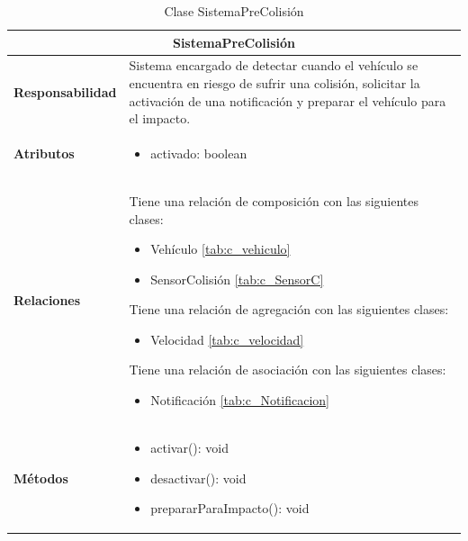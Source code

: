 \begin{table}[H]
\begin{center}
\begin{tabular}{p{} p{11cm}}
\multicolumn{2}{c}{\textbf{SistemaPreColisión} } \\ \hline \hline
\textbf{Responsabilidad} &  Sistema encargado de detectar cuando el vehículo se encuentra en riesgo de sufrir una colisión, solicitar la activación de una notificación y preparar el vehículo para el impacto.  \\ \hline
\textbf{Atributos} & \begin{itemize}
                      \item activado: boolean
                    \end{itemize}\\ \hline
\textbf{Relaciones} & \par Tiene una relación de composición con las siguientes clases:
                      \begin{itemize}
                        \item Vehículo \ref{tab:c_vehiculo}
                        \item SensorColisión \ref{tab:c_SensorC}
                      \end{itemize}

                      \par Tiene una relación de agregación con las siguientes clases:
                      \begin{itemize}
                        \item Velocidad \ref{tab:c_velocidad}
                      \end{itemize}

                      \par Tiene una relación de asociación con las siguientes clases:
                      \begin{itemize}
                        \item Notificación \ref{tab:c_Notificacion}
                      \end{itemize}


                      \\ \hline

\textbf{Métodos} &  \begin{itemize}
                      \item activar(): void
                      \item desactivar(): void
                      \item prepararParaImpacto(): void
                    \end{itemize}\\ \hline
\end{tabular}
\caption{Clase SistemaPreColisión}
\label{tab:c_SPColision}
\end{center}
\end{table}









